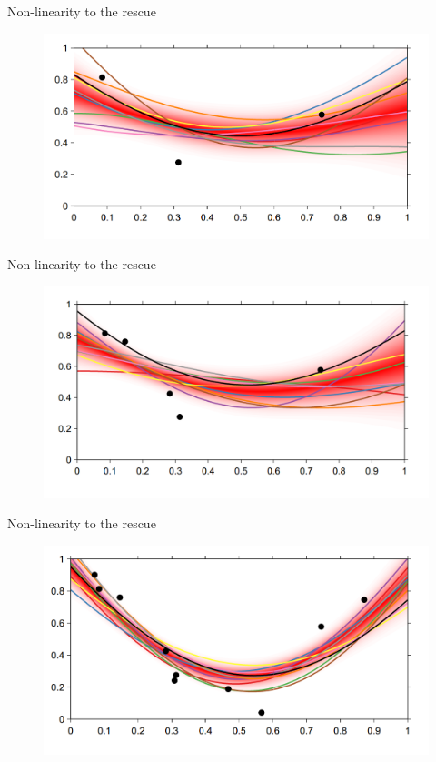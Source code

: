 \documentclass[12pt]{beamer}
\begin{document}
\begin{frame}{Non-linearity to the rescue}
\begin{figure}
\includegraphics[scale=0.4]{Bayesian_non_linear_17.png} 
\end{figure}
\end{frame}
\begin{frame}{Non-linearity to the rescue}
\begin{figure}
\includegraphics[scale=0.4]{Bayesian_non_linear_18.png} 
\end{figure}
\end{frame}
\begin{frame}{Non-linearity to the rescue}
\begin{figure}
\includegraphics[scale=0.4]{Bayesian_non_linear_19.png} 
\end{figure}

\end{frame}
\end{document}
